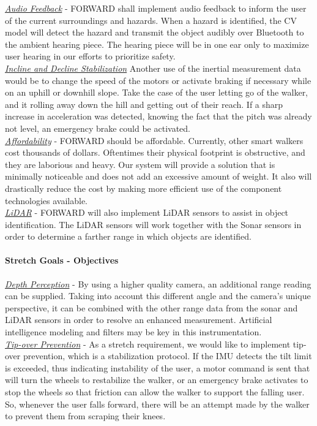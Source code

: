 \noindent \underline{\textit{Audio Feedback}} - FORWARD shall implement audio feedback to inform the user of the current surroundings and hazards. When a hazard is identified, the CV model will detect the hazard and transmit the object audibly over Bluetooth to the ambient hearing piece. The hearing piece will be in one ear only to maximize user hearing in our efforts to prioritize safety. \\

\noindent \underline{\textit{Incline and Decline Stabilization}}
Another use of the inertial measurement data would be to change the speed of the motors or activate braking if necessary while on an uphill or downhill slope. Take the case of the user letting go of the walker, and it rolling away down the hill and getting out of their reach. If a sharp increase in acceleration was detected, knowing the fact that the pitch was already not level, an emergency brake could be activated.\\

\noindent \underline{\textit{Affordability}} - FORWARD should be affordable. Currently, other smart walkers cost thousands of dollars. Oftentimes their physical footprint is obstructive, and they are laborious and heavy. Our system will provide a solution that is minimally noticeable and does not add an excessive amount of weight. It also will drastically reduce the cost by making more efficient use of the component technologies available. 
\\

\noindent \underline{\textit{LiDAR}} - FORWARD will also implement LiDAR sensors to assist in object identification. The LiDAR sensors will work together with the Sonar sensors in order to determine a farther range in which objects are identified.  
\\

\paragraph {Stretch Goals - Objectives} 

\noindent \newline \underline{\textit{Depth Perception}} - By using a higher quality camera, an additional range reading can be supplied. Taking into account this different angle and the camera’s unique perspective, it can be combined with the other range data from the sonar and LiDAR sensors in order to resolve an enhanced measurement. Artificial intelligence modeling and filters may be key in this instrumentation. \\

\noindent \underline{\textit{Tip-over Prevention}} - As a stretch requirement, we would like to implement tip-over prevention, which is a stabilization protocol. If the IMU detects the tilt limit is exceeded, thus indicating instability of the user, a motor command is sent that will turn the wheels to restabilize the walker, or an emergency brake activates to stop the wheels so that friction can allow the walker to support the falling user. So, whenever the user falls forward, there will be an attempt made by the walker to prevent them from scraping their knees. \\


